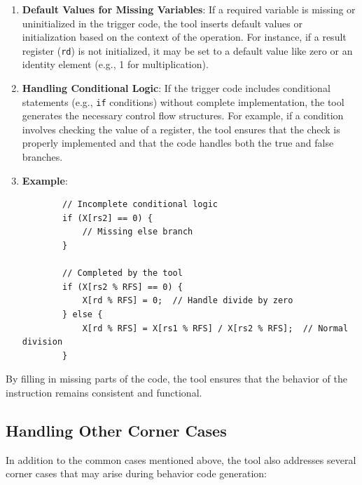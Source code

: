 \begin{enumerate}
    \item \textbf{Default Values for Missing Variables}: If a required variable is missing or uninitialized in the trigger code, the tool inserts default values or initialization based on the context of the operation. For instance, if a result register (\texttt{rd}) is not initialized, it may be set to a default value like zero or an identity element (e.g., 1 for multiplication).

    \item \textbf{Handling Conditional Logic}: If the trigger code includes conditional statements (e.g., \texttt{if} conditions) without complete implementation, the tool generates the necessary control flow structures. For example, if a condition involves checking the value of a register, the tool ensures that the check is properly implemented and that the code handles both the true and false branches.

    \item \textbf{Example}:
    \begin{lstlisting}
        // Incomplete conditional logic
        if (X[rs2] == 0) {
            // Missing else branch
        }

        // Completed by the tool
        if (X[rs2 % RFS] == 0) {
            X[rd % RFS] = 0;  // Handle divide by zero
        } else {
            X[rd % RFS] = X[rs1 % RFS] / X[rs2 % RFS];  // Normal division
        }
    \end{lstlisting}
\end{enumerate}

By filling in missing parts of the code, the tool ensures that the behavior of the instruction remains consistent and functional.

\subsection{Handling Other Corner Cases}

In addition to the common cases mentioned above, the tool also addresses several corner cases that may arise during behavior code generation:

